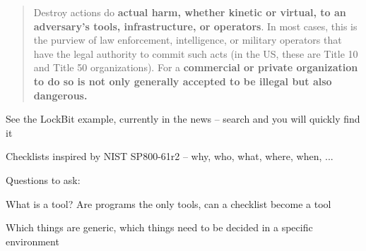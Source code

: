 \documentclass[Screen16to9,17pt]{foils}
\begin{document}


\begin{quote}
Destroy actions do {\bf actual harm, whether kinetic or virtual, to an adversary’s tools,
infrastructure, or operators}. In most cases, this is the purview of law enforcement,
intelligence, or military operators that have the legal authority to commit such acts
(in the US, these are Title 10 and Title 50 organizations). For a {\bf commercial or private
organization to do so is not only generally accepted to be illegal but also dangerous.}
\end{quote}

\begin{list2}
    \item See the LockBit example, currently in the news -- search and you will quickly find it
\end{list2}




\begin{list2}
\item Checklists inspired by NIST SP800-61r2 -- why, who, what, where, when, ...
\end{list2}



Questions to ask:
\begin{list2}
\item What is a tool? Are programs the only tools, can a checklist become a tool
\item Which things are generic, which things need to be decided in a specific environment
\end{list2}



\end{document}
